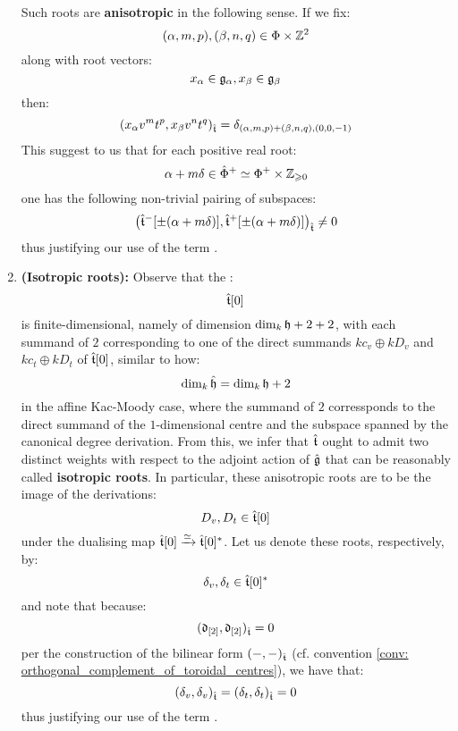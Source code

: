 \begin{remark}
\begin{enumerate}
                Such roots are \textbf{anisotropic} in the following sense. If we fix:
                    $$(\alpha, m, p), (\beta, n, q) \in \Phi \x \Z^2$$
                along with root vectors:
                    $$x_{\alpha} \in \mathfrak{g}_{\alpha}, x_{\beta} \in \mathfrak{g}_{\beta}$$
                then:
                    $$( x_{\alpha} v^m t^p, x_{\beta} v^n t^q )_{\hat{\mathfrak{t}}} = \delta_{(\alpha, m, p) + (\beta, n, q), (0, 0, -1)}$$
                This suggest to us that for each positive real root:
                    $$\alpha + m\delta \in \hat{\Phi}^+ \cong \Phi^+ \x \Z_{\geq 0}$$
                one has the following non-trivial pairing of subspaces:
                    $$\left( \hat{\mathfrak{t}}^-[\pm (\alpha + m\delta)], \hat{\mathfrak{t}}^+[\pm (\alpha + m\delta)] \right)_{\hat{\mathfrak{t}}} \not = 0$$
                thus justifying our use of the term .
                \item \textbf{(Isotropic roots):} Observe that the :
                    $$\hat{\mathfrak{t}}[0]$$
                is finite-dimensional, namely of dimension $\dim_{k} \mathfrak{h} + 2 + 2$, with each summand of $2$ corresponding to one of the direct summands $k c_v \oplus k D_v$ and $k c_t \oplus k D_t$ of $\hat{\mathfrak{t}}[0]$, similar to how:
                    $$\dim_{k} \hat{\mathfrak{h}} = \dim_{k} \mathfrak{h} + 2$$
                in the affine Kac-Moody case, where the summand of $2$ corressponds to the direct summand of the $1$-dimensional centre and the subspace spanned by the canonical degree derivation. From this, we infer that $\hat{\mathfrak{t}}$ ought to admit two distinct weights with respect to the adjoint action of $\hat{\mathfrak{g}}$ that can be reasonably called \textbf{isotropic roots}. In particular, these anisotropic roots are to be the image of the derivations:
                    $$D_v, D_t \in \hat{\mathfrak{t}}[0]$$
                under the dualising map $\hat{\mathfrak{t}}[0] \xrightarrow[]{\simeq} \hat{\mathfrak{t}}[0]^*$. Let us denote these roots, respectively, by:
                    $$\delta_v, \delta_t \in \hat{\mathfrak{t}}[0]^*$$
                and note that because:
                    $$(\mathfrak{d}_{[2]}, \mathfrak{d}_{[2]})_{\hat{\mathfrak{t}}} = 0$$
                per the construction of the bilinear form $(-, -)_{\hat{\mathfrak{t}}}$ (cf. convention \ref{conv: orthogonal_complement_of_toroidal_centres}), we have that:
                    $$(\delta_v, \delta_v)_{\hat{\mathfrak{t}}} = (\delta_t, \delta_t)_{\hat{\mathfrak{t}}} = 0$$
                thus justifying our use of the term .


\end{enumerate}
\end{remark}
